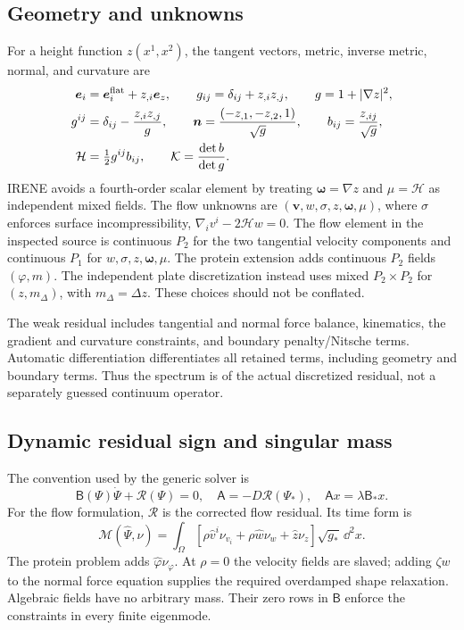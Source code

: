 \subsection{Geometry and unknowns}
For a height function $z(x^1,x^2)$, the tangent vectors, metric, inverse metric, normal, and curvature are
\begin{align}
\bm e_i&=\bm e_i^{\rm flat}+z_{,i}\bm e_z,\qquad g_{ij}=\delta_{ij}+z_{,i}z_{,j},\qquad g=1+|\nabla z|^2,\\
g^{ij}&=\delta_{ij}-\frac{z_{,i}z_{,j}}{g},\qquad
\bm n=\frac{(-z_{,1},-z_{,2},1)}{\sqrt g},\qquad
b_{ij}=\frac{z_{,ij}}{\sqrt g},\\
\mathcal H&=\tfrac12g^{ij}b_{ij},\qquad \mathcal K=\frac{\det b}{\det g}.
\end{align}
IRENE avoids a fourth-order scalar element by treating $\bm\omega=\nabla z$ and $\mu=\mathcal H$ as independent mixed fields. The flow unknowns are $(\bm v,w,\sigma,z,\bm\omega,\mu)$, where $\sigma$ enforces surface incompressibility, $\nabla_i v^i-2\mathcal H w=0$. The flow element in the inspected source is continuous $P_2$ for the two tangential velocity components and continuous $P_1$ for $w,\sigma,z,\bm\omega,\mu$. The protein extension adds continuous $P_2$ fields $(\varphi,m)$. The independent plate discretization instead uses mixed $P_2\times P_2$ for $(z,m_\Delta)$, with $m_\Delta=\Delta z$. These choices should not be conflated.

The weak residual includes tangential and normal force balance, kinematics, the gradient and curvature constraints, and boundary penalty/Nitsche terms. Automatic differentiation differentiates all retained terms, including geometry and boundary terms. Thus the spectrum is of the actual discretized residual, not a separately guessed continuum operator.

\subsection{Dynamic residual sign and singular mass}
The convention used by the generic solver is
\begin{equation}
\mathsf B(\Psi)\dot\Psi+\mathcal R(\Psi)=0,\quad
\mathsf A=-D\mathcal R(\Psi_*),\quad \mathsf A x=\lambda\mathsf B_*x.
\end{equation}
For the flow formulation, $\mathcal R$ is the corrected flow residual. Its time form is
\begin{equation}
\mathcal M(\widehat\Psi,\nu)=\int_\Omega
[\rho\widehat v^i\nu_{v_i}+\rho\widehat w\nu_w+\widehat z\nu_z]\sqrt{g_*}\,\dd^2x.
\end{equation}
The protein problem adds $\widehat\varphi\nu_\varphi$. At $\rho=0$ the velocity fields are slaved; adding $\zeta w$ to the normal force equation supplies the required overdamped shape relaxation. Algebraic fields have no arbitrary mass. Their zero rows in $\mathsf B$ enforce the constraints in every finite eigenmode.

